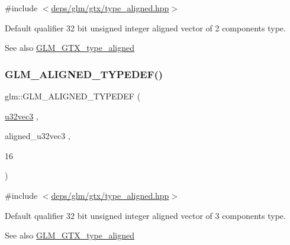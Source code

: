 {\ttfamily \#include $<$\hyperlink{gtx_2type__aligned_8hpp}{deps/glm/gtx/type\+\_\+aligned.\+hpp}$>$}

Default qualifier 32 bit unsigned integer aligned vector of 2 components type. \begin{DoxySeeAlso}{See also}
\hyperlink{group__gtx__type__aligned}{G\+L\+M\+\_\+\+G\+T\+X\+\_\+type\+\_\+aligned} 
\end{DoxySeeAlso}
\mbox{\label{group__gtx__type__aligned_ga0019500abbfa9c66eff61ca75eaaed94}} 
\subsubsection{\texorpdfstring{G\+L\+M\+\_\+\+A\+L\+I\+G\+N\+E\+D\+\_\+\+T\+Y\+P\+E\+D\+E\+F()}{GLM\_ALIGNED\_TYPEDEF()}\hspace{0.1cm}{\footnotesize\ttfamily [131/209]}}
{\footnotesize\ttfamily glm\+::\+G\+L\+M\+\_\+\+A\+L\+I\+G\+N\+E\+D\+\_\+\+T\+Y\+P\+E\+D\+EF (\begin{DoxyParamCaption}\item[{\hyperlink{group__gtc__type__precision_ga342e504c37b635393e6747b85147151f}{u32vec3}}]{,  }\item[{aligned\+\_\+u32vec3}]{,  }\item[{16}]{ }\end{DoxyParamCaption})}



{\ttfamily \#include $<$\hyperlink{gtx_2type__aligned_8hpp}{deps/glm/gtx/type\+\_\+aligned.\+hpp}$>$}

Default qualifier 32 bit unsigned integer aligned vector of 3 components type. \begin{DoxySeeAlso}{See also}
\hyperlink{group__gtx__type__aligned}{G\+L\+M\+\_\+\+G\+T\+X\+\_\+type\+\_\+aligned} 
\end{DoxySeeAlso}
\mbox{\label{group__gtx__type__aligned_ga14fd29d01dae7b08a04e9facbcc18824}} 
